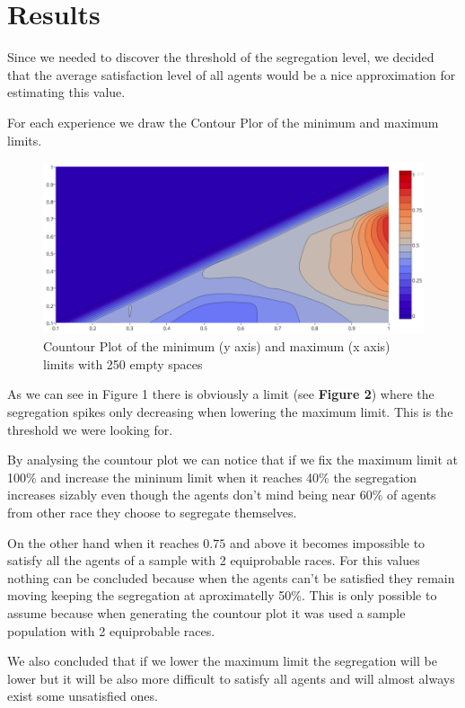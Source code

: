 \documentclass[a4paper,titlepage,11pt]{article}
\begin{document}
\section{Results}

Since we needed to discover the threshold of the segregation level, we decided that the average satisfaction level of all agents would be a nice approximation for estimating this value.

For each experience we draw the Contour Plor of the minimum and maximum limits.

\begin{figure}[h!]
    \centering
    \includegraphics[scale=0.40]{img/ploty.png}
    \caption{Countour Plot of the minimum (y axis) and maximum (x axis) limits with 250 empty spaces}
\end{figure}

As we can see in Figure 1 there is obviously a limit (see \textbf{Figure 2}) where the segregation spikes only decreasing
when lowering the maximum limit. This is the threshold we were looking for.

By analysing the countour plot we can notice that if we fix the maximum limit at 100\% and increase the mininum limit when
it reaches 40\% the segregation increases sizably even though the agents don't mind being near 60\% of agents from other
race they choose to segregate themselves.

On the other hand when it reaches $0.75$ and above it becomes impossible to satisfy all the agents of a sample with 2
equiprobable races. For this values nothing can be concluded because when the agents can't be satisfied they remain moving
keeping the segregation at aproximatelly 50\%. This is only possible to assume because when generating the countour plot
it was used a sample population with 2 equiprobable races.

We also concluded that if we lower the maximum limit the segregation will be lower but it will be also more difficult to
satisfy all agents and will almost always exist some unsatisfied ones.
\end{document}
